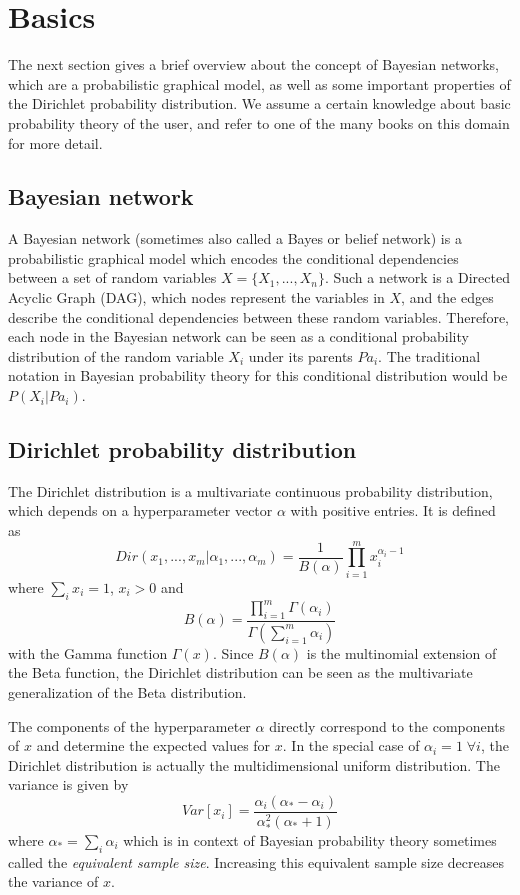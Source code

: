 \documentclass{article}
\begin{document}
\section{Basics}
	The next section gives a brief overview about the concept of Bayesian networks, which are a probabilistic
	graphical model, as well as some important properties of the Dirichlet probability distribution.
	We assume a certain knowledge about basic probability theory of the user, and refer to one of the many
	books on this domain for more detail.
	
	\subsection{Bayesian network}
	A Bayesian network (sometimes also called a Bayes or belief network) is a probabilistic graphical model
	which encodes the conditional dependencies between a set of random variables $X=\{X_1,..., X_n\}$.
	Such a network	is a Directed Acyclic Graph (DAG), which nodes represent the variables in $X$, and the edges 
	describe the conditional
	dependencies between these random variables. Therefore, each node in the Bayesian network can be seen as a 
	conditional probability distribution of the random variable $X_i$ under its parents $Pa_i$.
	The traditional notation in Bayesian probability theory for this conditional distribution
	would be $P(X_i|Pa_i)$.
	
	\subsection{Dirichlet probability distribution}
	The Dirichlet distribution is a multivariate continuous probability distribution, which depends on a
	hyperparameter vector $\alpha$ with positive entries. It is defined as
	\[
		Dir(x_1,...,x_m|\alpha_1, ..., \alpha_{m})=\frac{1}{B(\alpha)}\prod_{i=1}^m x_i^{\alpha_i -1}
	\]
	where $\sum_i x_i = 1$, $x_i>0$ and 
	\[
		B(\alpha)=\frac{\prod_{i=1}^m\Gamma(\alpha_i)}{\Gamma(\sum_{i=1}^m \alpha_i)}
	\]
	with the Gamma function $\Gamma(x)$. Since $B(\alpha)$ is the multinomial extension of the Beta function,
	the Dirichlet distribution can be seen as the	multivariate generalization of the Beta distribution.
	
	The components of the hyperparameter $\alpha$ directly correspond to the components of $x$ and determine
	the expected values for $x$. In the special case of $\alpha_i = 1 \; \forall i$, the Dirichlet distribution
	is actually the multidimensional uniform distribution. The variance is given by
	\[
		Var[x_i] = \frac{\alpha_i(\alpha_*-\alpha_i)}{\alpha_*^2(\alpha_* + 1)}
	\]
	where $\alpha_* = \sum_i \alpha_i$ which is in context of Bayesian probability theory sometimes
	called the \textit{equivalent sample size}. Increasing this equivalent sample size decreases the
	variance of $x$.
	
\end{document}
